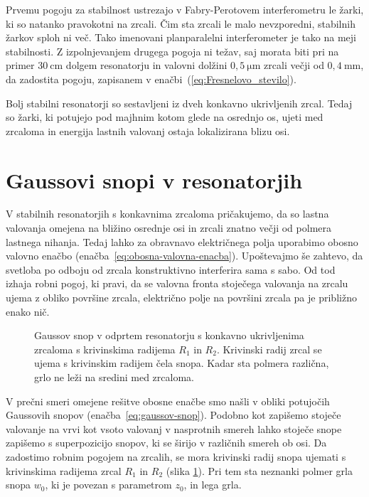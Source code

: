 Prvemu pogoju za stabilnost ustrezajo v Fabry-Perotovem interferometru
le žarki, ki so natanko pravokotni na zrcali. Čim sta zrcali le
malo nevzporedni, stabilnih žarkov sploh ni več. Tako imenovani planparalelni 
interferometer je tako na meji stabilnosti. Z izpolnjevanjem drugega
pogoja ni težav, saj morata biti pri na primer $30~\si{\centi\metre}$ dolgem resonatorju in 
valovni dolžini $0,5~\si{\micro\metre}$ zrcali večji od $0,4~\si{\milli\metre}$, da zadostita pogoju, 
zapisanem v enačbi~(\ref{eq:Fresnelovo_stevilo}).

Bolj stabilni resonatorji so sestavljeni iz dveh konkavno ukrivljenih
zrcal. Tedaj so žarki, ki potujejo pod majhnim kotom glede na osrednjo os, ujeti
med zrcaloma in energija lastnih valovanj ostaja lokalizirana blizu
osi.

\section{Gaussovi snopi v resonatorjih}
V stabilnih resonatorjih s konkavnima zrcaloma pričakujemo, da so
lastna valovanja omejena na bližino osrednje osi in zrcali znatno 
večji od polmera lastnega nihanja. Tedaj lahko za obravnavo
električnega polja uporabimo obosno valovno 
enačbo (enačba~\ref{eq:obosna-valovna-enacba}). Upoštevajmo še zahtevo,
da svetloba po odboju od zrcala konstruktivno interferira sama s sabo.
Od tod izhaja robni pogoj, ki pravi, da se valovna fronta stoječega valovanja na 
zrcalu ujema z obliko površine zrcala, električno polje na površini zrcala
pa je približno enako nič.

\begin{figure}[h]
\centering
\def\svgwidth{100truemm} 

\caption{Gaussov snop v odprtem resonatorju s konkavno ukrivljenima zrcaloma
s krivinskima radijema $R_1$ in $R_2$. 
Krivinski radij zrcal se ujema s krivinskim radijem čela snopa. Kadar sta polmera
različna, grlo ne leži na sredini med zrcaloma.}
\label{fig:Gaussov-snop-v-resonatorju}
\end{figure}

V prečni smeri omejene rešitve obosne enačbe smo našli v obliki potujočih
Gaussovih snopov (enačba~\ref{eq:gaussov-snop}). 
Podobno kot zapišemo stoječe valovanje na vrvi kot
vsoto valovanj v nasprotnih smereh
lahko stoječe snope zapišemo s superpozicijo snopov, ki se širijo v različnih smereh ob osi. 
Da zadostimo robnim pogojem na zrcalih, se mora krivinski radij snopa ujemati s
krivinskima radijema zrcal $R_{1}$ in $R_{2}$ (slika \ref{fig:Gaussov-snop-v-resonatorju}).
Pri tem sta neznanki polmer grla snopa $w_0$, ki je povezan s parametrom $z_{0}$,
in lega grla. 

